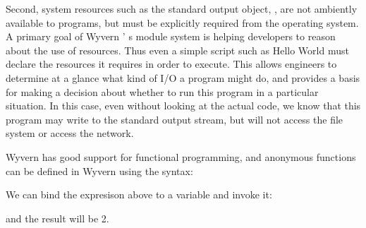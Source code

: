 \documentclass{article}
\begin{document}
\begin{mdP}[class={indent},data-line={80}]%
{}Second, system resources such as the standard output object, %
{}%
{},
are not ambiently available to programs, but must be explicitly required
from the operating system.  A primary goal of Wyvern%
{}{'}%
{}s module system
is helping developers to reason about the use of resources.  Thus even
a simple script such as Hello World must declare the resources it
requires in order to execute.  This allows engineers to determine at a
glance what kind of I/O a program might do, and provides a basis for
making a decision about whether to run this program in a particular
situation.  In this case, even without looking at the actual code, we
know that this program may write to the standard output stream, but will
not access the file system or access the network.%
\end{mdP}%
\begin{mdP}[data-line={96}]%
{}Wyvern has good support for functional programming, and anonymous functions can be defined in Wyvern using the syntax:%
\end{mdP}%
\begin{mdPre}[class={para-block,pre-indented},data-line={98}]%
%
\end{mdPre}%
\begin{mdP}[data-line={100}]%
{}We can bind the expresison above to a variable and invoke it:%
\end{mdP}%
\begin{mdPre}[class={para-block,pre-indented},data-line={102}]%
%
\end{mdPre}%
\begin{mdP}[data-line={105}]%
{}and the result will be 2.%
\end{mdP}%
\end{document}
